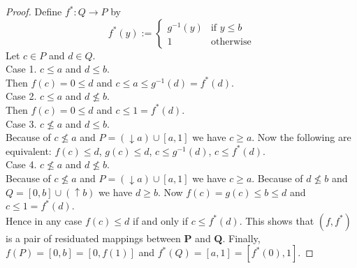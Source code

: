 \documentclass[12pt]{article}
\begin{document}
\begin{proof}
Define $f^*\colon Q\to P$ by
\[
f^*(y):=\left\{
\begin{array}{ll}
g^{-1}(y) & \text{if }y\le b \\
1         & \text{otherwise}
\end{array}
\right.
\]
Let $c\in P$ and $d\in Q$. \\
Case 1. $c\le a$ and $d\le b$. \\
Then $f(c)=0\le d$ and $c\le a\le g^{-1}(d)=f^*(d)$. \\
Case 2. $c\le a$ and $d\not\le b$. \\
Then $f(c)=0\le d$ and $c\le1=f^*(d)$. \\
Case 3. $c\not\le a$ and $d\le b$. \\
Because of $c\not\le a$ and $P=(\downarrow a)\cup[a,1]$ we have $c\ge a$. Now the following are equivalent: $f(c)\le d$, $g(c)\le d$, $c\le g^{-1}(d)$, $c\le f^*(d)$. \\
Case 4. $c\not\le a$ and $d\not\le b$. \\
Because of $c\not\le a$ and $P=(\downarrow a)\cup[a,1]$ we have $c\ge a$. Because of $d\not\le b$ and $Q=[0,b]\cup(\uparrow b)$ we have $d\ge b$. Now $f(c)=g(c)\le b\le d$ and $c\le1=f^*(d)$. \\
Hence in any case $f(c)\le d$ if and only if $c\le f^*(d)$. This shows that $(f,f^*)$ is a pair of residuated mappings between $\mathbf P$ and $\mathbf Q$. Finally, $f(P)=[0,b]=[0,f(1)]$ and $f^*(Q)=[a,1]=[f^*(0),1]$.
\end{proof}
\end{document}
